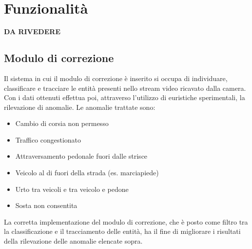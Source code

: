 \chapter{Funzionalità}
\label{sec:funzionalita}

\textbf{DA RIVEDERE}

\section{Modulo di correzione}
Il sistema in cui il modulo di correzione è inserito si occupa di individuare, classificare e tracciare le entità presenti nello stream video ricavato dalla camera.
Con i dati ottenuti effettua poi, attraverso l'utilizzo di euristiche sperimentali, la rilevazione di anomalie.
Le anomalie trattate sono:
\begin{itemize}
    \item Cambio di corsia non permesso
    \item Traffico congestionato
    \item Attraversamento pedonale fuori dalle strisce 
    \item Veicolo al di fuori della strada (es. marciapiede) %
    \item Urto tra veicoli e tra veicolo e pedone
    \item Sosta non consentita
\end{itemize}
La corretta implementazione del modulo di correzione, che è posto come filtro tra la classificazione e il tracciamento delle entità, ha il fine di migliorare i risultati della rilevazione delle anomalie elencate sopra.

